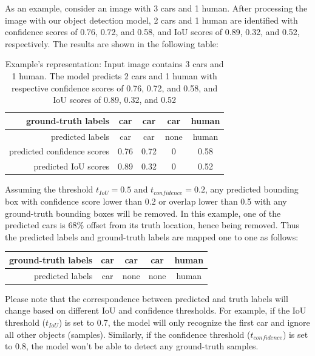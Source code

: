 As an example, consider an image with 3 cars and 1 human. After processing the image with our object detection model, 2 cars and 1 human are identified with confidence scores of 0.76, 0.72, and 0.58, and IoU scores of 0.89, 0.32, and 0.52, respectively. The results are shown in the following table:
\begin{table}[H]
    \centering
    \begin{tabular}{rcccc}
        ground-truth labels         & car  & car  & car  & human \\ \hline
        predicted labels            & car  & car  & none & human \\ \hline
        predicted confidence scores & 0.76 & 0.72 & 0    & 0.58  \\ \hline
        predicted IoU scores        & 0.89 & 0.32 & 0    & 0.52 
    \end{tabular}
    \caption{Example's representation: Input image contains 3 cars and 1 human. The model predicts 2 cars and 1 human with respective confidence scores of 0.76, 0.72, and 0.58, and IoU scores of 0.89, 0.32, and 0.52} \label{ex:truth_pred_score_map}
\end{table}

\noindent Assuming the threshold $t_{IoU}=0.5$ and $t_{confidence}=0.2$, any predicted bounding box with confidence score lower than 0.2 or overlap lower than 0.5 with any ground-truth bounding boxes will be removed. In this example, one of the predicted cars is 68\% offset from its truth location, hence being removed. Thus the predicted labels and ground-truth labels are mapped one to one as follows:
\begin{table}[H]
    \centering
    \begin{tabular}{rcccc}
    ground-truth labels         & car  & car  & car  & human \\ \hline
    predicted labels            & car  & none & none & human
    \end{tabular}
\end{table}

\noindent Please note that the correspondence between predicted and truth labels will change based on different IoU and confidence thresholds. For example, if the IoU threshold ($t_{IoU}$) is set to 0.7, the model will only recognize the first car and ignore all other objects (samples). Similarly, if the confidence threshold ($t_{confidence}$) is set to 0.8, the model won't be able to detect any ground-truth samples.

